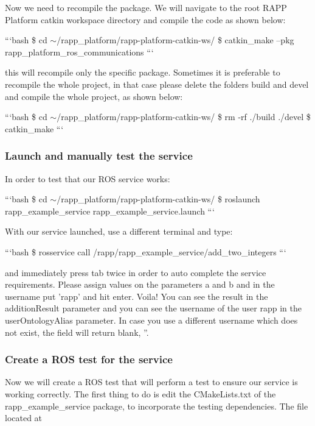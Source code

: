 Now we need to recompile the package. We will navigate to the root R\-A\-P\-P Platform catkin workspace directory and compile the code as shown below\-:

```bash \$ cd $\sim$/rapp\-\_\-platform/rapp-\/platform-\/catkin-\/ws/ \$ catkin\-\_\-make --pkg rapp\-\_\-platform\-\_\-ros\-\_\-communications ```

this will recompile only the specific package. Sometimes it is preferable to recompile the whole project, in that case please delete the folders build and devel and compile the whole project, as shown below\-:

```bash \$ cd $\sim$/rapp\-\_\-platform/rapp-\/platform-\/catkin-\/ws/ \$ rm -\/rf ./build ./devel \$ catkin\-\_\-make ```

\subsubsection*{Launch and manually test the service}

In order to test that our R\-O\-S service works\-:

```bash \$ cd $\sim$/rapp\-\_\-platform/rapp-\/platform-\/catkin-\/ws/ \$ roslaunch rapp\-\_\-example\-\_\-service rapp\-\_\-example\-\_\-service.\-launch ```

With our service launched, use a different terminal and type\-:

```bash \$ rosservice call /rapp/rapp\-\_\-example\-\_\-service/add\-\_\-two\-\_\-integers ```

and immediately press tab twice in order to auto complete the service requirements. Please assign values on the parameters a and b and in the username put 'rapp' and hit enter. Voila! You can see the result in the addition\-Result parameter and you can see the username of the user rapp in the user\-Ontology\-Alias parameter. In case you use a different username which does not exist, the field will return blank, ''.

\subsubsection*{Create a R\-O\-S test for the service}

Now we will create a R\-O\-S test that will perform a test to ensure our service is working correctly. The first thing to do is edit the {\ttfamily C\-Make\-Lists.\-txt} of the rapp\-\_\-example\-\_\-service package, to incorporate the testing dependencies. The file located at

